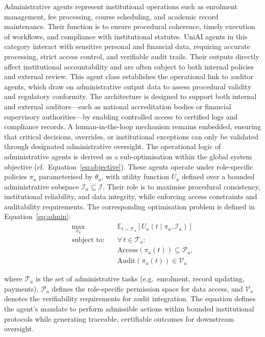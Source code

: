 \documentclass[oneside,10pt]{swissi}
\begin{document}
Administrative agents represent institutional operations such as enrolment management, fee processing, course scheduling, and academic record maintenance. Their function is to ensure procedural coherence, timely execution of workflows, and compliance with institutional statutes. UniAI agents in this category interact with sensitive personal and financial data, requiring accurate processing, strict access control, and verifiable audit trails. Their outputs directly affect institutional accountability and are often subject to both internal policies and external review. This agent class establishes the operational link to auditor agents, which draw on administrative output data to assess procedural validity and regulatory conformity. The architecture is designed to support both internal and external auditors—such as national accreditation bodies or financial supervisory authorities—by enabling controlled access to certified logs and compliance records. A human-in-the-loop mechanism remains embedded, ensuring that critical decisions, overrides, or institutional exceptions can only be validated through designated administrative oversight. The operational logic of administrative agents is derived as a sub-optimisation within the global system objective (cf.\ Equation~\ref{eq:objective}). These agents operate under role-specific policies $\pi_a$ parameterised by $\theta_a$, with utility function $U_a$ defined over a bounded administrative subspace $\mathcal{I}_a \subseteq \mathcal{I}$. Their role is to maximise procedural consistency, institutional reliability, and data integrity, while enforcing access constraints and auditability requirements. The corresponding optimisation problem is defined in Equation~\ref{eq:admin}:
\begin{align}
\label{eq:admin}
\max_{\pi_a} \quad & \mathbb{E}_{t \sim \mathcal{T}_a} \left[ U_a(t \mid \pi_a, \mathcal{I}_a) \right] \\
\text{subject to:} \quad
& \forall\, t \in \mathcal{T}_a: \nonumber \\
& \text{Access}(\pi_a(t)) \subseteq \mathcal{P}_a, \nonumber \\
& \text{Audit}(\pi_a(t)) \in \mathcal{V}_a \nonumber
\end{align}

where $\mathcal{T}_a$ is the set of administrative tasks (e.g.\ enrolment, record updating, payments), $\mathcal{P}_a$ defines the role-specific permission space for data access, and $\mathcal{V}_a$ denotes the verifiability requirements for audit integration. The equation defines the agent’s mandate to perform admissible actions within bounded institutional protocols while generating traceable, certifiable outcomes for downstream oversight.
\end{document}
